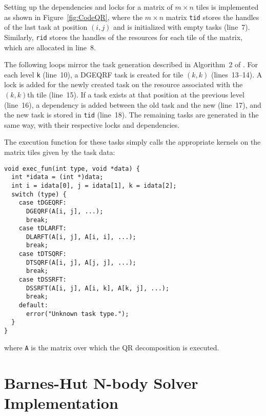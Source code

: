 \documentclass[fleqn,10pt]{wlpeerj}
\newcommand{\fig}[1]
    {Figure~\ref{fig:#1}}
\begin{document}
Setting up the dependencies and locks for a matrix of
$m\times n$ tiles is implemented as shown in \fig{CodeQR},
where the $m\times n$ matrix {\tt tid} stores the handles
of the last task at position $(i,j)$ and is initialized with
empty tasks (line~7).
Similarly, {\tt rid} stores the handles of the resources for each
tile of the matrix, which are allocated in line~8.

The following loops mirror the task generation described in
Algorithm~2 of \citep{ref:Buttari2009}.
For each level {\tt k} (line~10), a DGEQRF task is created
for tile $(k,k)$ (lines~13--14).
A lock is added for the newly created task on the
resource associated with the $(k,k)$th tile (line~15).
If a task exists at that position at the previous level
(line~16), a dependency is added between the old task and
the new (line~17), and the new task is stored in {\tt tid}
(line~18).
The remaining tasks are generated in the same way, with
their respective locks and dependencies.

The execution function for these tasks simply calls the appropriate
kernels on the matrix tiles given by the task data:
\begin{center}\begin{minipage}{0.9\textwidth}
    \begin{lstlisting}
void exec_fun(int type, void *data) {
  int *idata = (int *)data;
  int i = idata[0], j = idata[1], k = idata[2];
  switch (type) {
    case tDGEQRF:
      DGEQRF(A[i, j], ...);
      break;
    case tDLARFT:
      DLARFT(A[i, j], A[i, i], ...);
      break;
    case tDTSQRF:
      DTSQRF(A[i, j], A[j, j], ...);
      break;
    case tDSSRFT:
      DSSRFT(A[i, j], A[i, k], A[k, j], ...);
      break;
    default:
      error("Unknown task type.");
  }
}
    \end{lstlisting}
\end{minipage}\end{center}
\noindent where {\tt A} is the matrix over which the QR
decomposition is executed.


\section{Barnes-Hut N-body Solver Implementation}
\end{document}
